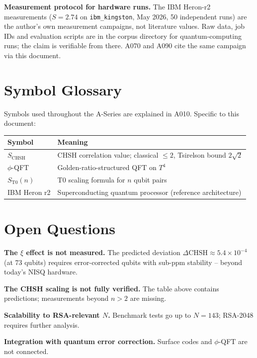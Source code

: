 \textbf{Measurement protocol for hardware runs.} The IBM Heron-r2 measurements
($S=2{.}74$ on \texttt{ibm\_kingston}, May 2026, 50 independent runs) are the
author's own measurement campaigns, not literature values. Raw data, job IDs and
evaluation scripts are in the corpus directory for quantum-computing runs; the
claim is verifiable from there. A070 and A090 cite the same campaign via this
document.

\section{Symbol Glossary}

Symbols used throughout the A-Series are explained in A010.
Specific to this document:

\begin{center}
\renewcommand{\arraystretch}{1.3}
{\small\begin{tabular}{lp{9cm}}
\toprule
Symbol & Meaning \\
\midrule
$S_\text{CHSH}$ & CHSH correlation value; classical $\leq2$, Tsirelson bound $2\sqrt2$ \\
$\phi$-QFT & Golden-ratio-structured QFT on $T^4$ \\
$S_\text{T0}(n)$ & T0 scaling formula for $n$ qubit pairs \\
IBM Heron r2 & Superconducting quantum processor (reference architecture) \\
\bottomrule
\end{tabular}}
\renewcommand{\arraystretch}{1.0}
\end{center}

\section{Open Questions}

\textbf{The $\xi$ effect is not measured.} The predicted deviation
$\Delta\text{CHSH}\approx5{.}4\times10^{-4}$ (at 73 qubits) requires error-corrected
qubits with sub-ppm stability -- beyond today's NISQ hardware.

\textbf{The CHSH scaling is not fully verified.} The table above contains
predictions; measurements beyond $n>2$ are missing.

\textbf{Scalability to RSA-relevant $N$.} Benchmark tests go up to $N=143$; RSA-2048
requires further analysis.

\textbf{Integration with quantum error correction.} Surface codes and $\phi$-QFT
are not connected.

